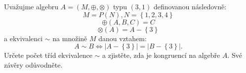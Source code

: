 Uvažujme algebru $A=\left ( M,\oplus ,\otimes  \right )$ typu $(3,1)$
definovanou následovně: $$M=P(N),N=\left \{ 1,2,3,4 \right \}$$ $$\oplus
(A,B,C)=C$$ $$\otimes (A)=A-\left \{ 3 \right \}$$ a ekvivalenci $\sim$ na
množině $M$ danou vztahem: $$A \sim B \Leftrightarrow \left |  A-\left \{ 3
\right \} \right |=\left | B-\left \{ 3 \right \} \right |.$$  Určete počet tříd
ekvivalence $\sim$ a zjistěte, zda je kongruencí na algebře $A$. Své závěry
odůvodněte.
